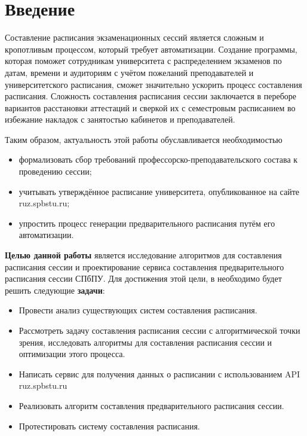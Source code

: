 \chapter*{Введение} %

Составление расписания экзаменационных сессий является сложным и кропотливым процессом, который требует автоматизации. Создание программы, которая поможет сотрудникам университета с распределением экзаменов по датам, времени и аудиториям с учётом пожеланий преподавателей и университетского расписания, сможет значительно ускорить процесс составления расписания.
Сложность составления расписания сессии заключается в переборе вариантов расстановки аттестаций и сверкой их с семестровым расписанием во избежание накладок с занятостью кабинетов и преподавателей. 

Таким образом, актуальность этой работы обуславливается необходимостью
\begin{itemize}
	\item формализовать сбор требований профессорско-преподавательского состава к проведению сессии;
	\item учитывать утверждённое расписание университета, опубликованное на сайте ruz.spbstu.ru;
	\item упростить процесс генерации предварительного расписания путём его автоматизации.
\end{itemize}

\textbf{Целью данной работы} является исследование алгоритмов для составления расписания сессии и проектирование сервиса составления предварительного расписания сессии СПбПУ.
Для достижения этой цели, в необходимо будет решить следующие \textbf{задачи}:

\begin{itemize}
	\item Провести анализ существующих систем составления расписания.
	\item Рассмотреть задачу составления расписания сессии с алгоритмической точки зрения, исследовать алгоритмы для составления расписания сессии и оптимизации этого процесса.
	\item Написать сервис для получения данных о расписании с использованием API ruz.spbstu.ru
	\item Реализовать алгоритм составления предварительного расписания сессии. 
	\item Протестировать систему составления расписания.
\end{itemize}
